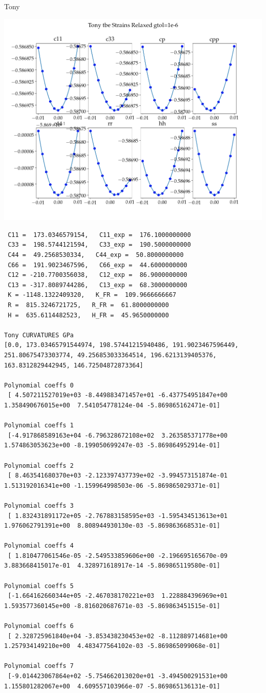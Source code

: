 \documentclass[11pt]{article}
\begin{document}
Tony
\begin{center}
\includegraphics[width=.9\linewidth]{Images/tony_ec_09-01-19_gtol1e-6.png}
\end{center}
\begin{verbatim}
 C11 =  173.0346579154,   C11_exp =  176.1000000000
 C33 =  198.5744121594,   C33_exp =  190.5000000000
 C44 =  49.2568530334,   C44_exp =  50.8000000000
 C66 =  191.9023467596,   C66_exp =  44.6000000000
 C12 = -210.7700356038,   C12_exp =  86.9000000000
 C13 = -317.8089744286,   C13_exp =  68.3000000000
 K = -1148.1322409320,   K_FR =  109.9666666667
 R =  815.3246721725,   R_FR =  61.8000000000
 H =  635.6114482523,   H_FR =  45.9650000000 

Tony CURVATURES GPa 
[0.0, 173.03465791544974, 198.57441215940486, 191.9023467596449, 251.80675473303774, 49.256853033364514, 196.6213139405376, 163.8312829442945, 146.72504872873364]

Polynomial coeffs 0 
 [ 4.507211527019e+03 -8.449883471457e+01 -6.437754951847e+00  1.358490676015e+00  7.541054778124e-04 -5.869865162471e-01]

Polynomial coeffs 1 
 [-4.917868589163e+04 -6.796328672108e+02  3.263585371778e+00  1.574863053623e+00 -8.199050699247e-03 -5.869864952914e-01]

Polynomial coeffs 2 
 [ 8.463541680370e+03 -2.123397437739e+02 -3.994573151874e-01  1.513192016341e+00 -1.159964998503e-06 -5.869865029371e-01]

Polynomial coeffs 3 
 [ 1.832431891172e+05 -2.767883158595e+03 -1.595434513613e+01  1.976062791391e+00  8.808944930130e-03 -5.869863668531e-01]

Polynomial coeffs 4 
 [ 1.810477061546e-05 -2.549533859606e+00 -2.196695165670e-09  3.883668415017e-01  4.328971618917e-14 -5.869865119580e-01]

Polynomial coeffs 5 
 [-1.664162660344e+05 -2.467038170221e+03  1.228884396969e+01  1.593577360145e+00 -8.816020687671e-03 -5.869863451515e-01]

Polynomial coeffs 6 
 [ 2.328725961840e+04 -3.853438230453e+02 -8.112889714681e+00  1.257934149210e+00  4.483477564102e-03 -5.869865099068e-01]

Polynomial coeffs 7 
 [-9.014423067864e+02 -5.754662013020e+01 -3.494500291531e+00  1.155801282067e+00  4.609557103966e-07 -5.869865136131e-01]

\end{verbatim}
\end{document}
